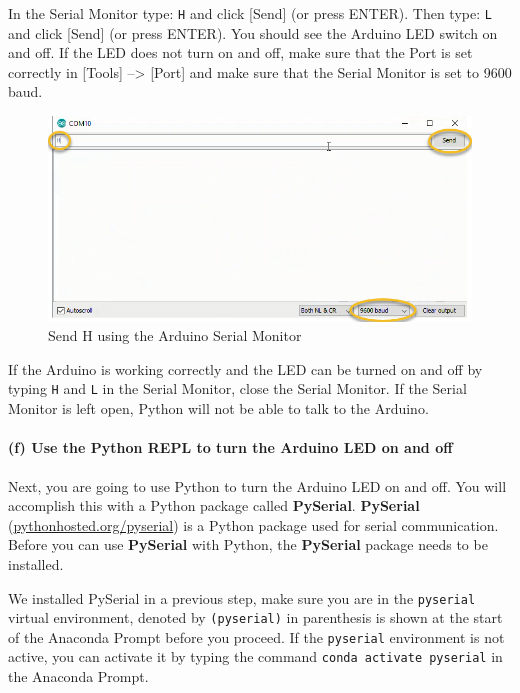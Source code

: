 \documentclass[11pt]{article}
\begin{document}
In the Serial Monitor type: \texttt{H} and click {[}Send{]} (or press
ENTER). Then type: \texttt{L} and click {[}Send{]} (or press ENTER). You
should see the Arduino LED switch on and off. If the LED does not turn
on and off, make sure that the Port is set correctly in {[}Tools{]}
--\textgreater{} {[}Port{]} and make sure that the Serial Monitor is set
to 9600 baud.

\begin{figure}
\centering
\includegraphics{images/serial_monitor_H.png}
\caption{Send H using the Arduino Serial Monitor}
\end{figure}

If the Arduino is working correctly and the LED can be turned on and off
by typing \texttt{H} and \texttt{L} in the Serial Monitor, close the
Serial Monitor. If the Serial Monitor is left open, Python will not be
able to talk to the Arduino.

    \hypertarget{f-use-the-python-repl-to-turn-the-arduino-led-on-and-off}{%
\paragraph{(f) Use the Python REPL to turn the Arduino LED on and
off}\label{f-use-the-python-repl-to-turn-the-arduino-led-on-and-off}}

Next, you are going to use Python to turn the Arduino LED on and off.
You will accomplish this with a Python package called \textbf{PySerial}.
\textbf{PySerial}
(\href{https://pythonhosted.org/pyserial/}{pythonhosted.org/pyserial})
is a Python package used for serial communication. Before you can use
\textbf{PySerial} with Python, the \textbf{PySerial} package needs to be
installed.

We installed PySerial in a previous step, make sure you are in the
\texttt{pyserial} virtual environment, denoted by \texttt{(pyserial)} in
parenthesis is shown at the start of the Anaconda Prompt before you
proceed. If the \texttt{pyserial} environment is not active, you can
activate it by typing the command \texttt{conda\ activate\ pyserial} in
the Anaconda Prompt.
\end{document}
